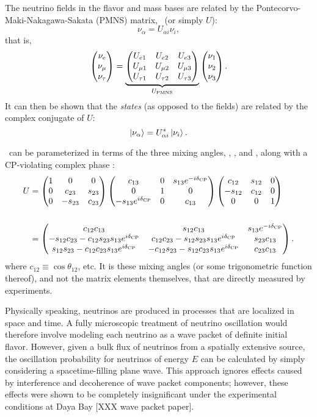 \documentclass[../thesis.tex]{subfiles}
\begin{document}
The neutrino fields in the flavor and mass bases are related by the Pontecorvo-Maki-Nakagawa-Sakata (PMNS) matrix, \upmns\ (or simply $U$):
\[\nu_\alpha = U_{\alpha i} \nu_i,\]
that is,
\[  \begin{pmatrix} {\nu_e} \\ {\nu_\mu} \\ {\nu_\tau} \end{pmatrix} = \underbrace{ \begin{pmatrix} U_{e 1} & U_{e 2} & U_{e 3} \\ U_{\mu 1} & U_{\mu 2} & U_{\mu 3} \\ U_{\tau 1} & U_{\tau 2} & U_{\tau 3} \end{pmatrix}}_{ U_\mathrm{PMNS}}  \begin{pmatrix} \nu_1 \\ \nu_2 \\ \nu_3 \end{pmatrix}. \]
It can then be shown that the \emph{states} (as opposed to the fields) are related by the complex conjugate of $U$:
\[\ket{\nu_\alpha} = U^*_{\alpha i}\ket{\nu_i}.\]

\upmns\ can be parameterized in terms of the three mixing angles, \tAB, \tBC, and \tAC, along with a CP-violating complex phase \dcp:
\begin{align*}
  \label{eq:upmnsParam}
  U &= \upmnsFactored \\\\
    &= \upmnsFull.
\end{align*}
where $c_{12} \equiv \cos\theta_{12}$, etc. It is these mixing angles (or some trigonometric function thereof), and not the matrix elements themselves, that are directly measured by experiments.

Physically speaking, neutrinos are produced in processes that are localized in space and time. A fully microscopic treatment of neutrino oscillation would therefore involve modeling each neutrino as a wave packet of definite initial flavor. However, given a bulk flux of neutrinos from a spatially extensive source, the oscillation probability for neutrinos of energy $E$ can be calculated by simply considering a spacetime-filling plane wave. This approach ignores effects caused by interference and decoherence of wave packet components; however, these effects were shown to be completely insignificant under the experimental conditions at Daya Bay [XXX wave packet paper].

\newcommand\nuF{\nu^{\mathrm{F}}}
\newcommand\nuM{\nu^{\mathrm{M}}}
\end{document}

